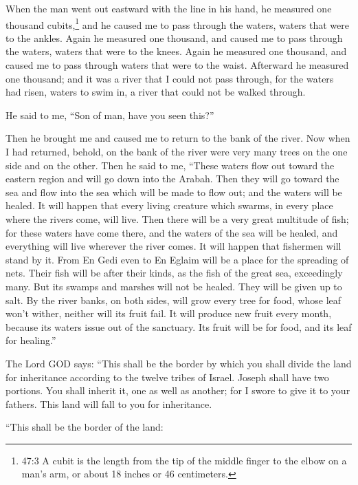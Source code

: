 \myverse{}When the man went out eastward with the line in his hand, he measured
one thousand cubits,\footnote{47:3 A cubit is the length from the tip of the middle finger to the elbow on a man’s arm, or about
	18 inches or 46 centimeters.} and he caused me to pass through the waters, waters that were to
the ankles.
\myverse{}Again he measured one thousand, and caused me to pass through the waters, waters
that were to the knees. Again he measured one thousand, and caused me to pass through waters that were
to the waist.
\myverse{}Afterward he measured one thousand; and it was a river that I could not pass
through, for the waters had risen, waters to swim in, a river that could not be walked through.

\myverse{}He said to me, “Son of man, have you seen this?”

Then he brought me and caused me to return to the bank of the river.
\myverse{}Now when I had returned, behold, on the bank of the river were very many trees
on the one side and on the other.
\myverse{}Then he said to me, “These waters flow out toward the eastern region and will
go down into the Arabah. Then they will go toward the sea and flow into the sea which will be made to
flow out; and the waters will be healed.
\myverse{}It will happen that every living creature which swarms, in every place where
the rivers come, will live. Then there will be a very great multitude of fish; for these waters have come
there, and the waters of the sea will be healed, and everything will live wherever the river comes.
\myverse{}It will happen that fishermen will stand by it. From En Gedi even to En Eglaim
will be a place for the spreading of nets. Their fish will be after their kinds, as the fish of the great
sea, exceedingly many.
\myverse{}But its swamps and marshes will not be healed. They will be given up to salt.
\myverse{}By the river banks, on both sides, will grow every tree for food, whose leaf
won’t wither, neither will its fruit fail. It will produce new fruit every month, because its waters issue
out of the sanctuary. Its fruit will be for food, and its leaf for healing.”

\myverse{}The Lord GOD says: “This shall be the border by which you shall
divide the land for inheritance according to the twelve tribes of Israel. Joseph shall have two portions.
\myverse{}You shall inherit it, one as well as another; for I swore to give it to your
fathers. This land will fall to you for inheritance.

\myverse{}“This shall be the border of the land:

